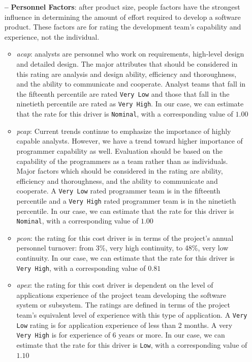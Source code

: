 \begin{itemize}
\begin{itemize}
	\end{itemize}
	
\item[\textbf{--}] \textbf{Personnel Factors}: after product size, people factors have the strongest influence in determining the amount of effort required to develop a software product. These factors are for rating the development team's capability and experience, not the individual. 

\begin{itemize}
	
	\item \textit{\acl{acap}}: analysts are personnel who work on requirements, high-level design and detailed design. The major attributes that should be considered in this rating are analysis and design ability, efficiency and thoroughness, and the ability to communicate and cooperate. Analyst teams that fall in the fifteenth percentile are rated \texttt{Very Low} and those that fall in the ninetieth percentile are rated as \texttt{Very High}.  In our case, we can estimate that the rate for this driver is \texttt{Nominal}, with a corresponding value of $1.00$
		
	\item \textit{\acl{pcap}}: Current trends continue to emphasize the importance of highly capable analysts. However, we have a trend toward higher importance of programmer capability as well.
Evaluation should be based on the capability of the programmers as a team rather than as individuals. Major factors which should be considered in the rating are ability, efficiency and thoroughness, and the ability to communicate and cooperate. A \texttt{Very Low} rated programmer team is in the fifteenth percentile and a \texttt{Very High} rated programmer team is in the ninetieth percentile. In our case, we can estimate that the rate for this driver is \texttt{Nominal}, with a corresponding value of $1.00$

	\item \textit{\acl{pcon}}: the rating for this cost driver is in terms of the project's annual personnel turnover: from 3\%, very high continuity, to 48\%, very low continuity. In our case, we can estimate that the rate for this driver is \texttt{Very High}, with a corresponding value of $0.81$
	
	\item \textit{\acl{apex}}: the rating for this cost driver is dependent on the level of applications experience of the project team developing the software system or subsystem. The ratings are defined in terms of the project team's equivalent level of experience with this type of application. A \texttt{Very Low} rating is for application experience of less than 2 months. A very \texttt{Very High} is for experience of 6 years or more. In our case, we can estimate that the rate for this driver is \texttt{Low}, with a corresponding value of $1.10$
	

\end{itemize}
\end{itemize}
